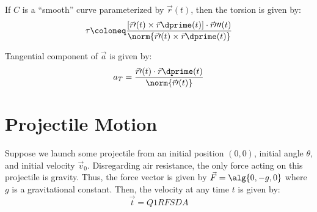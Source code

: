 \begin{thmbox}{}{}
    If $C$ is a ``smooth'' curve parameterized by $\vec{r}(t)$, then the torsion is given by:
    \[ \tau \coloneq \frac{ \left[ \vec{r}\prime(t) \times \vec{r}\dprime(t) \right] \cdot \vec{r}\prime\prime\prime(t)}{\norm{\vec{r}\prime(t) \times \vec{r}\dprime(t)}} \]
\end{thmbox}

Tangential component of $\vec{a}$ is given by:
\[ a_T = \frac{\vec{r}\prime(t) \cdot \vec{r}\dprime(t)}{\norm{\vec{r}\prime(t)}} \]

\section{Projectile Motion}

Suppose we launch some projectile from an initial position $(0,0)$, initial angle $\theta$, and initial velocity $\vec{v}_0$. Disregarding air resistance, the only force acting on this projectile is gravity. Thus, the force vector is given by $\vec{F} = \alg{0, -g, 0}$ where $g$ is a gravitational constant. Then, the velocity at any time $t$ is given by:
\[ \vec{t} = Q1RFSDA \]
